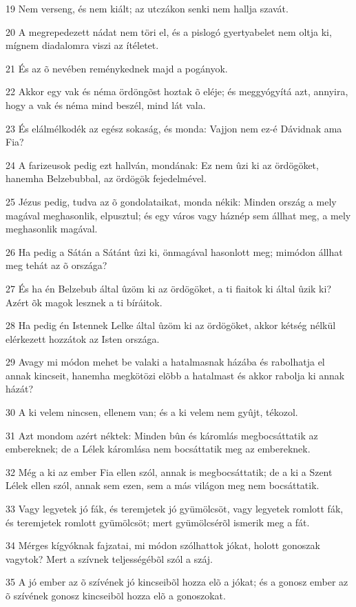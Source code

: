 \par 19 Nem verseng, és nem kiált; az utczákon senki nem hallja szavát.
\par 20 A megrepedezett nádat nem töri el, és a pislogó gyertyabelet nem oltja ki, mígnem diadalomra viszi az ítéletet.
\par 21 És az õ nevében reménykednek majd a pogányok.
\par 22 Akkor egy vak és néma ördöngõst hoztak õ eléje; és meggyógyítá azt, annyira, hogy a vak és néma mind beszél, mind lát vala.
\par 23 És elálmélkodék az egész sokaság, és monda: Vajjon nem ez-é Dávidnak ama Fia?
\par 24 A farizeusok pedig ezt hallván, mondának: Ez nem ûzi ki az ördögöket, hanemha Belzebubbal, az ördögök fejedelmével.
\par 25 Jézus pedig, tudva az õ gondolataikat, monda nékik: Minden ország a mely magával meghasonlik, elpusztul; és egy város vagy háznép sem állhat meg, a mely meghasonlik magával.
\par 26 Ha pedig a Sátán a Sátánt ûzi ki, önmagával hasonlott meg; mimódon állhat meg tehát az õ országa?
\par 27 És ha én Belzebub által ûzöm ki az ördögöket, a ti fiaitok ki által ûzik ki? Azért õk magok lesznek a ti bíráitok.
\par 28 Ha pedig én Istennek Lelke által ûzöm ki az ördögöket, akkor kétség nélkül elérkezett hozzátok az Isten országa.
\par 29 Avagy mi módon mehet be valaki a hatalmasnak házába és rabolhatja el annak kincseit, hanemha megkötözi elõbb a hatalmast és akkor rabolja ki annak házát?
\par 30 A ki velem nincsen, ellenem van; és a ki velem nem gyûjt, tékozol.
\par 31 Azt mondom azért néktek: Minden bûn és káromlás megbocsáttatik az embereknek; de a Lélek káromlása nem bocsáttatik meg az embereknek.
\par 32 Még a ki az ember Fia ellen szól, annak is megbocsáttatik; de a ki a Szent Lélek ellen szól, annak sem ezen, sem a más világon meg nem bocsáttatik.
\par 33 Vagy legyetek jó fák, és teremjetek jó gyümölcsöt, vagy legyetek romlott fák, és teremjetek romlott gyümölcsöt; mert gyümölcsérõl ismerik meg a fát.
\par 34 Mérges kígyóknak fajzatai, mi módon szólhattok jókat, holott gonoszak vagytok? Mert a szívnek teljességébõl szól a száj.
\par 35 A jó ember az õ szívének jó kincseibõl hozza elõ a jókat; és a gonosz ember az õ szívének gonosz kincseibõl hozza elõ a gonoszokat.
